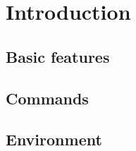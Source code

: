 \chapter{Introduction}



\section{Basic features}

\blindtext

\section{Commands}

\blindtext

\section{Environment}

\blindtext
